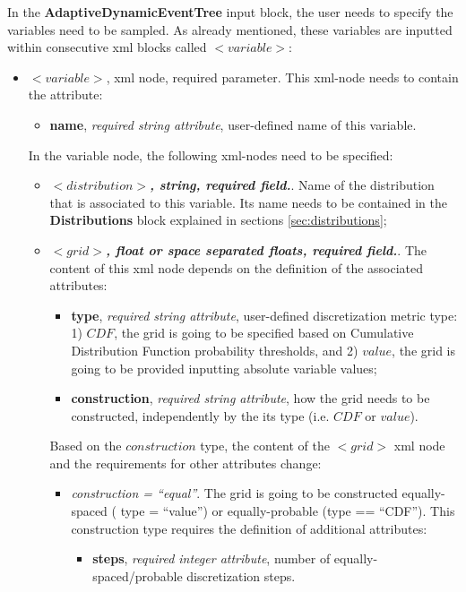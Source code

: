 In the \textbf{AdaptiveDynamicEventTree} input block, the user needs to specify the variables need to be sampled. As already mentioned, these variables are inputted within consecutive xml blocks called $<variable>$:
\begin{itemize}
\item $<variable>$, xml node, required parameter. This xml-node needs to contain the attribute:
\begin{itemize}
  \item \textbf{name}, \textit{required string attribute}, user-defined name of this variable. 
 \end{itemize}
 In the variable node, the following xml-nodes need to be specified:
 \begin{itemize}
    \item $<distribution>$\textbf{\textit{, string, required field.}}. Name of the distribution that is associated to this variable. Its name needs to be contained in the \textbf{Distributions} block explained in sections \ref{sec:distributions};
    \item $<grid>$\textbf{\textit{, float or space separated floats, required field.}}. The content of this xml node depends on the definition of the associated attributes:
\begin{itemize}
\itemsep0em
\item \textbf{type}, \textit{required string attribute}, user-defined discretization metric type: 1) $CDF$, the grid is going to be specified based on  Cumulative Distribution Function probability thresholds, and 2) $value$, the grid is going to be provided inputting absolute variable values;
\item \textbf{construction}, \textit{required string attribute}, how the grid needs to be constructed, independently by the its type (i.e. $CDF$ or $value$). 
\end{itemize}
Based on the $construction$ type, the content of the $<grid>$ xml node and the requirements for other attributes change:
\begin{itemize}
  \item \textit{construction = ``equal''}. The grid is going to be constructed equally-spaced ( type = ``value'') or equally-probable (type == ``CDF''). This construction type requires the definition of additional attributes:
      \begin{itemize}
         \item \textbf{steps}, \textit{required integer attribute}, number of equally-spaced/probable discretization steps.

\end{itemize}
\end{itemize}
\end{itemize}
\end{itemize}
